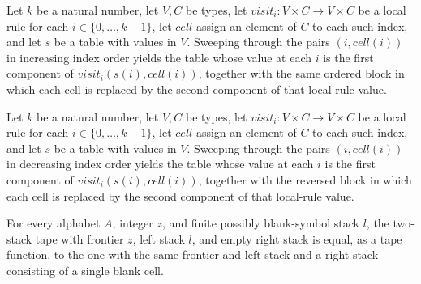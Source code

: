 \begin{lemma}
\label{Turing.FinTM.indexedFold_block}
\leanok
{}
Let $k$ be a natural number, let $V,C$ be types, let $\mathit{visit}_i:V\times C\to
V\times C$ be a local rule for each $i\in\{0,\ldots,k-1\}$, let $\mathit{cell}$ assign
an element of $C$ to each such index, and let $s$ be a table with values in $V$.
Sweeping through the pairs $(i,\mathit{cell}(i))$ in increasing index order yields the
table whose value at each $i$ is the first component of
$\mathit{visit}_i(s(i),\mathit{cell}(i))$, together with the same ordered block in which
each cell is replaced by the second component of that local-rule value.
\end{lemma}

\begin{lemma}
\label{Turing.FinTM.indexedFold_block_reverse}
\leanok
{}
Let $k$ be a natural number, let $V,C$ be types, let $\mathit{visit}_i:V\times C\to
V\times C$ be a local rule for each $i\in\{0,\ldots,k-1\}$, let $\mathit{cell}$ assign
an element of $C$ to each such index, and let $s$ be a table with values in $V$.
Sweeping through the pairs $(i,\mathit{cell}(i))$ in decreasing index order yields the
table whose value at each $i$ is the first component of
$\mathit{visit}_i(s(i),\mathit{cell}(i))$, together with the reversed block in which
each cell is replaced by the second component of that local-rule value.
\end{lemma}

\begin{lemma}
\label{Turing.FinTM.sweepTape_nil}
\leanok
{}
For every alphabet $A$, integer $z$, and finite possibly blank-symbol stack $l$, the
two-stack tape with frontier $z$, left stack $l$, and empty right stack is equal, as a
tape function, to the one with the same frontier and left stack and a right stack
consisting of a single blank cell.
\end{lemma}


